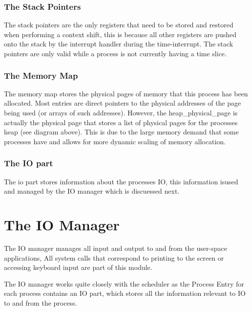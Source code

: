 \documentclass[a4paper]{report}
\begin{document}
\subsubsection{The Stack Pointers}
The stack pointers are the only registers that need to be stored and restored when performing a context shift, this is because all other registers are pushed onto the stack by the interrupt handler during the time-interrupt. The stack pointers are only valid while a process is not currently having a time slice.

\subsubsection{The Memory Map}

The memory map stores the physical pages of memory that this process has been allocated. Most entries are direct pointers to the physical addresses of the page being used (or arrays of such addresses). However, the heap\_physical\_page is actually the physical page that stores a list of physical pages for the processes heap (see diagram above). This is due to the large memory demand that some processes have and allows for more dynamic scaling of memory allocation.

\subsubsection{The IO part}

The io part stores information about the processes IO, this information isused and managed by the IO manager which is discuessed next.



















\clearpage

\section{The IO Manager}

The IO manager manages all input and output to and from the user-space applications, All system calls that correspond to printing to the screen or accessing keyboard input are part of this module.

The IO manager works quite closely with the scheduler as the Process Entry for each process contains an IO part, which stores all the information relevant to IO to and from the process.
\end{document}
